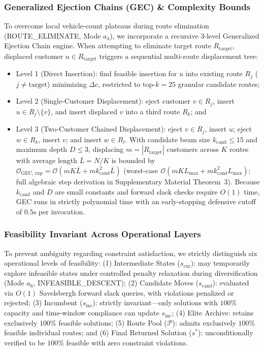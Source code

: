 \documentclass{ieeeaccess}
\begin{document}
\subsubsection{Generalized Ejection Chains (GEC) \& Complexity Bounds}
\label{sec:gec_methodology}
To overcome local vehicle-count plateaus during route elimination (\textsf{\small ROUTE\_\allowbreak ELIMINATE}, Mode $a_4$), we incorporate a recursive 3-level Generalized Ejection Chain engine. When attempting to eliminate target route $R_{\text{target}}$, displaced customer $u \in R_{\text{target}}$ triggers a sequential multi-route displacement tree:
\begin{itemize}
    \item[(i)] Level 1 (Direct Insertion): find feasible insertion for $u$ into existing route $R_j$ ($j \neq \text{target}$) minimizing $\Delta c$, restricted to top-$k=25$ granular candidate routes;
    \item[(ii)] Level 2 (Single-Customer Displacement): eject customer $v \in R_j$, insert $u \in R_j \setminus \{v\}$, and insert displaced $v$ into a third route $R_k$; and
    \item[(iii)] Level 3 (Two-Customer Chained Displacement): eject $v \in R_j$, insert $u$; eject $w \in R_k$, insert $v$; and insert $w \in R_l$.
With candidate beam size $k_{\text{cand}} \le 15$ and maximum depth $D \le 3$, displacing $m = |R_{\text{target}}|$ customers across $K$ routes with average length $\bar{L} = N/K$ is bounded by $\mathcal{O}_{\text{GEC, exp}} = \mathcal{O}(m K \bar{L} + m k_{\text{cand}}^2 \bar{L})$ (worst-case $\mathcal{O}(m K L_{\max} + m k_{\text{cand}}^2 L_{\max})$; full algebraic step derivation in Supplementary Material Theorem~3). Because $k_{\text{cand}}$ and $D$ are small constants and forward slack checks require $O(1)$ time, GEC runs in strictly polynomial time with an early-stopping defensive cutoff of $0.5\text{s}$ per invocation.  
\end{itemize} 

\subsubsection{Feasibility Invariant Across Operational Layers}
\label{sec:feasibility_invariant}
To prevent ambiguity regarding constraint satisfaction, we strictly distinguish six operational levels of feasibility: (1) Intermediate States ($s_{\text{cur}}$): may temporarily explore infeasible states under controlled penalty relaxation during diversification (Mode $a_6$, \textsf{\small INFEASIBLE\_DESCENT}); (2) Candidate Moves ($s_{\text{cand}}$): evaluated via $O(1)$ Savelsbergh forward slack queries, with violations penalized or rejected; (3) Incumbent ($s_{\text{inc}}$): strictly invariant---only solutions with $100\%$ capacity and time-window compliance can update $s_{\text{inc}}$; (4) Elite Archive: retains exclusively $100\%$ feasible solutions; (5) Route Pool ($\mathcal{P}$): admits exclusively $100\%$ feasible individual routes; and (6) Final Returned Solution ($s^*$): unconditionally verified to be $100\%$ feasible with zero constraint violations.
\end{document}
